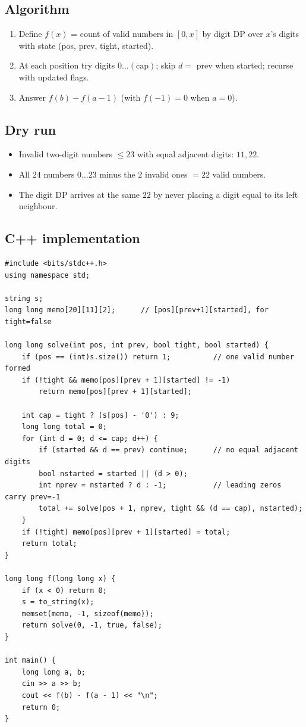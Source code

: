 \subsection*{Algorithm}

\begin{enumerate}
  \item Define $f(x)$ = count of valid numbers in $[0,x]$ by digit DP
        over $x$'s digits with state (pos, prev, tight, started).
  \item At each position try digits $0\ldots(\text{cap})$; skip $d=$
        prev when started; recurse with updated flags.
  \item Answer $f(b)-f(a-1)$ (with $f(-1)=0$ when $a=0$).
\end{enumerate}

\subsection*{Dry run}


\begin{itemize}
  \item Invalid two-digit numbers $\le23$ with equal adjacent digits:
        $11,22$.
  \item All $24$ numbers $0\ldots23$ minus the $2$ invalid ones $=22$
        valid numbers.
  \item The digit DP arrives at the same $22$ by never placing a digit
        equal to its left neighbour.
\end{itemize}

\subsection*{C++ implementation}

\begin{lstlisting}
#include <bits/stdc++.h>
using namespace std;

string s;
long long memo[20][11][2];      // [pos][prev+1][started], for tight=false

long long solve(int pos, int prev, bool tight, bool started) {
    if (pos == (int)s.size()) return 1;          // one valid number formed
    if (!tight && memo[pos][prev + 1][started] != -1)
        return memo[pos][prev + 1][started];

    int cap = tight ? (s[pos] - '0') : 9;
    long long total = 0;
    for (int d = 0; d <= cap; d++) {
        if (started && d == prev) continue;      // no equal adjacent digits
        bool nstarted = started || (d > 0);
        int nprev = nstarted ? d : -1;           // leading zeros carry prev=-1
        total += solve(pos + 1, nprev, tight && (d == cap), nstarted);
    }
    if (!tight) memo[pos][prev + 1][started] = total;
    return total;
}

long long f(long long x) {
    if (x < 0) return 0;
    s = to_string(x);
    memset(memo, -1, sizeof(memo));
    return solve(0, -1, true, false);
}

int main() {
    long long a, b;
    cin >> a >> b;
    cout << f(b) - f(a - 1) << "\n";
    return 0;
}
\end{lstlisting}

